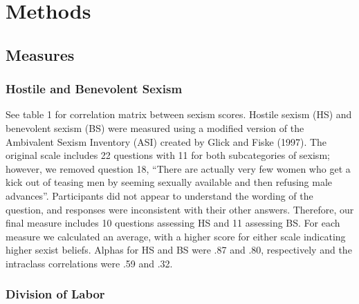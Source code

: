 \documentclass[
  man]{apa6}
\begin{document}
\hypertarget{methods}{%
\section{Methods}\label{methods}}

\hypertarget{measures}{%
\subsection{Measures}\label{measures}}

\hypertarget{hostile-and-benevolent-sexism}{%
\subsubsection{Hostile and Benevolent Sexism}\label{hostile-and-benevolent-sexism}}

See table 1 for correlation matrix between sexism scores. Hostile sexism (HS) and benevolent sexism (BS) were measured using a modified version of the Ambivalent Sexism Inventory (ASI) created by Glick and Fiske (1997). The original scale includes 22 questions with 11 for both subcategories of sexism; however, we removed question 18, ``There are actually very few women who get a kick out of teasing men by seeming sexually available and then refusing male advances''. Participants did not appear to understand the wording of the question, and responses were inconsistent with their other answers. Therefore, our final measure includes 10 questions assessing HS and 11 assessing BS. For each measure we calculated an average, with a higher score for either scale indicating higher sexist beliefs. Alphas for HS and BS were .87 and .80, respectively and the intraclass correlations were .59 and .32.

\hypertarget{division-of-labor}{%
\subsubsection{Division of Labor}\label{division-of-labor}}
\end{document}
